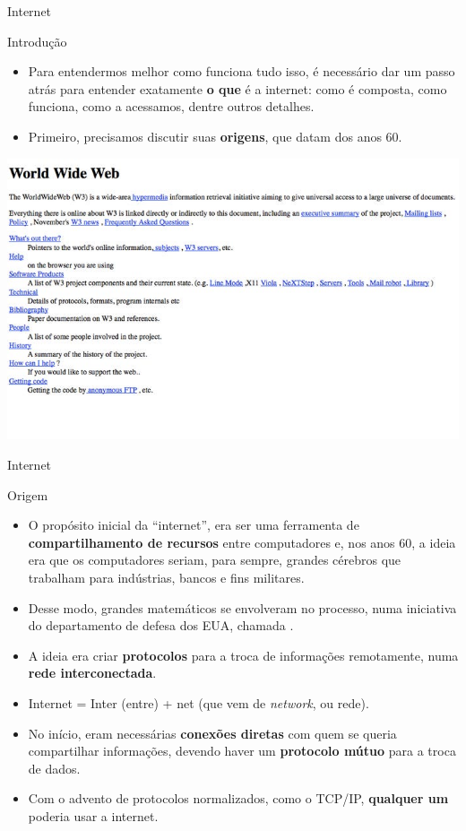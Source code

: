 \begin{frame}{Internet}
	\begin{block}{Introdução}
		\begin{itemize}
			\item Para entendermos melhor como funciona tudo isso, é necessário dar um passo atrás para entender exatamente \textbf{o que} é a internet: como é composta, como funciona, como a acessamos, dentre outros detalhes.
			\item Primeiro, precisamos discutir suas \textbf{origens}, que datam dos anos 60.
		\end{itemize}
	\end{block}

	\centering
	\includegraphics[width=0.75\linewidth]{Figuras/Ch03/fig7.2}
\end{frame}


\begin{frame}{Internet}
	\begin{block}{Origem}
		\begin{itemize}
			\item O propósito inicial da ``internet'', era ser uma ferramenta de \textbf{compartilhamento de recursos} entre computadores e, nos anos 60, a ideia era que os computadores seriam, para sempre, grandes cérebros que trabalham para indústrias, bancos e fins militares.
			\item Desse modo, grandes matemáticos se envolveram no processo, numa iniciativa do departamento de defesa dos EUA, chamada .
			\item A ideia era criar \textbf{protocolos} para a troca de informações remotamente, numa \textbf{rede interconectada}.
			\item Internet = Inter (entre) + net (que vem de \textit{network}, ou rede).
			\item No início, eram necessárias \textbf{conexões diretas} com quem se queria compartilhar informações, devendo haver um \textbf{protocolo mútuo} para a troca de dados.
			\item Com o advento de protocolos normalizados, como o TCP/IP, \textbf{qualquer um} poderia usar a internet.
		\end{itemize}
	\end{block}

\end{frame}


